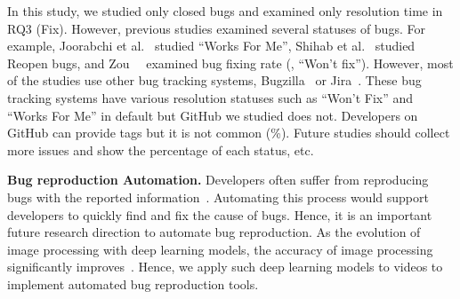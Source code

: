 In this study, we studied only closed bugs and examined only resolution time in RQ3 (Fix). However, previous studies examined several statuses of bugs. For example, Joorabchi et al.~\citep{DBLP:conf/msr/JoorabchiMM14} studied ``Works For Me'', Shihab et al.~\citep{DBLP:journals/ese/ShihabIKIOAHM13} studied Reopen bugs, and Zou~\et~\citep{DBLP:conf/compsac/ZouXZCL15} examined bug fixing rate (\eg, ``Won't fix''). However, most of the studies use other bug tracking systems, Bugzilla~\citep{Bugzilla} or Jira~\citep{JIRA}. These bug tracking systems have various resolution statuses such as ``Won't Fix'' and ``Works For Me''  in default but GitHub we studied does not. Developers on GitHub can provide tags but it is not common (\%). Future studies should collect more issues and show the percentage of each status, etc. 

\noindent
\textbf{Bug reproduction Automation.}
Developers often suffer from reproducing bugs with 
the reported information~\citep{DBLP:conf/sigsoft/ChaparroLZMPMBN17}\citep{DBLP:conf/icsm/0001KC20}\citep{zimmermann2010TSE}.
Automating this process would support developers 
to quickly find and fix the cause of bugs. 
Hence, it is an important future research direction 
to automate bug reproduction. 
As the evolution of image processing with deep learning models, 
the accuracy of image processing significantly improves~\citep{DBLP:conf/nips/KrizhevskySH12}. 
Hence, we apply such deep learning models to videos 
to implement automated bug reproduction tools. 





